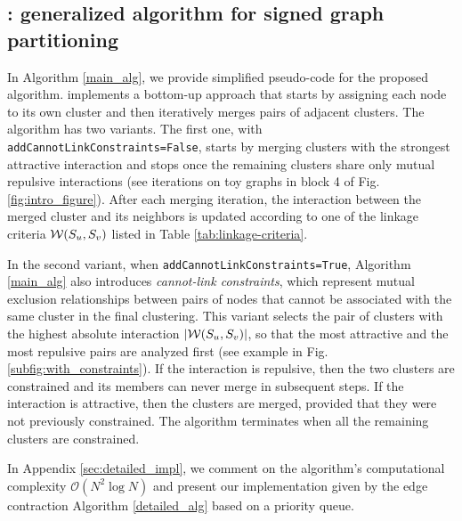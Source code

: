 \subsection{\algname{}: generalized algorithm for signed graph partitioning} \label{sec:algorithm} 

In Algorithm \ref{main_alg}, we provide simplified pseudo-code for the proposed \algname{} algorithm. \algname{} implements a bottom-up approach that starts by assigning each node to its own cluster and then iteratively merges pairs of adjacent clusters. The algorithm has two variants. The first one, with \texttt{addCannotLinkConstraints=False}, starts by merging clusters with the strongest attractive interaction and stops once the remaining clusters share only mutual repulsive interactions (see iterations on toy graphs in block 4 of Fig. \hyperref[fig:intro_figure]{\ref*{fig:intro_figure}}). After each merging iteration, the interaction between the merged cluster and its neighbors is updated according to one of the linkage criteria $\mathcal{W}(S_u, S_v)$ listed in Table \ref{tab:linkage-criteria}.

In the second variant, when \texttt{addCannotLinkConstraints=True}, Algorithm \ref{main_alg} also introduces \emph{cannot-link constraints}, which represent mutual exclusion relationships between pairs of nodes that cannot be associated with the same cluster in the final clustering. This variant 
selects the pair of clusters with the highest absolute interaction $|\mathcal{W}(S_u, S_v)|$, so that the most attractive and the most repulsive pairs are analyzed first (see example in Fig. \ref{subfig:with_constraints}). If the interaction is repulsive, then the two clusters are constrained and its members can never merge in subsequent steps. If the interaction is attractive, then the clusters are merged, provided that they were not previously constrained. 
The algorithm terminates when all the remaining clusters are constrained.

In Appendix \ref{sec:detailed_impl}, we comment on the algorithm's computational complexity $\mathcal{O}(N^2 \log N)$ and present our implementation given by the edge contraction Algorithm \ref{detailed_alg} based on a priority queue. 

